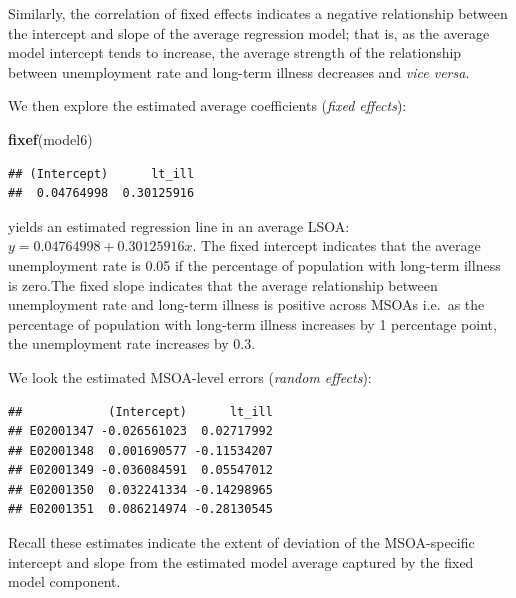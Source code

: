 \documentclass[]{book}
\newenvironment{Shaded}{\begin{snugshade}}{\end{snugshade}}
\newcommand{\KeywordTok}[1]{\textcolor[rgb]{0.13,0.29,0.53}{\textbf{#1}}}
\newcommand{\DecValTok}[1]{\textcolor[rgb]{0.00,0.00,0.81}{#1}}
\newcommand{\StringTok}[1]{\textcolor[rgb]{0.31,0.60,0.02}{#1}}
\newcommand{\OperatorTok}[1]{\textcolor[rgb]{0.81,0.36,0.00}{\textbf{#1}}}
\newcommand{\NormalTok}[1]{#1}
\begin{document}
Similarly, the correlation of fixed effects indicates a negative
relationship between the intercept and slope of the average regression
model; that is, as the average model intercept tends to increase, the
average strength of the relationship between unemployment rate and
long-term illness decreases and \emph{vice versa}.

We then explore the estimated average coefficients (\emph{fixed
effects}):

\begin{Shaded}
\begin{Highlighting}[]
\KeywordTok{fixef}\NormalTok{(model6)}
\end{Highlighting}
\end{Shaded}

\begin{verbatim}
## (Intercept)      lt_ill 
##  0.04764998  0.30125916
\end{verbatim}

yields an estimated regression line in an average LSOA:
\(y = 0.04764998 + 0.30125916x\). The fixed intercept indicates that the
average unemployment rate is 0.05 if the percentage of population with
long-term illness is zero.The fixed slope indicates that the average
relationship between unemployment rate and long-term illness is positive
across MSOAs i.e.~as the percentage of population with long-term illness
increases by 1 percentage point, the unemployment rate increases by 0.3.

We look the estimated MSOA-level errors (\emph{random effects}):

\begin{Shaded}
\end{Shaded}

\begin{verbatim}
##            (Intercept)      lt_ill
## E02001347 -0.026561023  0.02717992
## E02001348  0.001690577 -0.11534207
## E02001349 -0.036084591  0.05547012
## E02001350  0.032241334 -0.14298965
## E02001351  0.086214974 -0.28130545
\end{verbatim}

Recall these estimates indicate the extent of deviation of the
MSOA-specific intercept and slope from the estimated model average
captured by the fixed model component.
\end{document}
